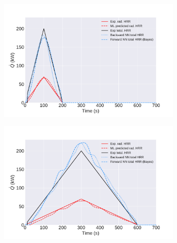\documentclass{article}
\begin{document}
\begin{figure}[htbp]
  \centering
  \begin{subfigure}[t]{.45\textwidth}
      \centering
      \includegraphics[width=\textwidth,keepaspectratio]{figures/100s_triangle_final.pdf}
      \caption{}
      \label{fig:final_result_100s_triangle}
  \end{subfigure}
  \begin{subfigure}[t]{.45\textwidth}
      \centering
      \includegraphics[width=\textwidth ,keepaspectratio]{figures/300s_triangle_final.pdf}
      \caption{}
      \label{fig:final_result_300s_triangle}
  \end{subfigure}
   \begin{subfigure}[t]{.45\textwidth}
      \centering

\end{subfigure}
\end{figure}
\end{document}
